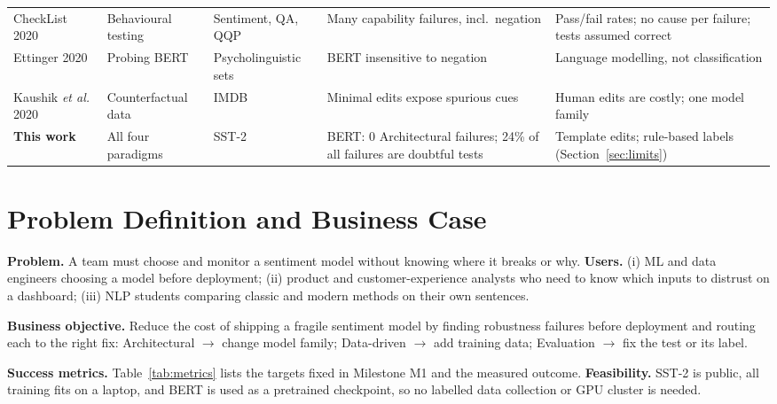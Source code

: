 \documentclass[conference]{IEEEtran}
\begin{document}
\begin{table}[t]
\begin{tabular}{@{}p{3.0cm}p{2.6cm}p{2.5cm}p{3.6cm}p{4.6cm}@{}}
CheckList 2020~\cite{ribeiro2020} & Behavioural testing & Sentiment, QA, QQP & Many capability failures, incl.\ negation & Pass/fail rates; no cause per failure; tests assumed correct \\
Ettinger 2020~\cite{ettinger2020} & Probing BERT & Psycholinguistic sets & BERT insensitive to negation & Language modelling, not classification \\
Kaushik \emph{et al.} 2020~\cite{kaushik2020} & Counterfactual data & IMDB & Minimal edits expose spurious cues & Human edits are costly; one model family \\
\midrule
\textbf{This work} & All four paradigms & SST-2 & BERT: 0 Architectural failures; 24\% of all failures are doubtful tests & Template edits; rule-based labels (Section~\ref{sec:limits}) \\
\bottomrule
\end{tabular}
\end{table}

\section{Problem Definition and Business Case}\label{sec:problem}

\textbf{Problem.} A team must choose and monitor a sentiment model without knowing where it breaks
or why. \textbf{Users.} (i) ML and data engineers choosing a model before deployment; (ii) product
and customer-experience analysts who need to know which inputs to distrust on a dashboard; (iii)
NLP students comparing classic and modern methods on their own sentences.

\textbf{Business objective.} Reduce the cost of shipping a fragile sentiment model by finding
robustness failures before deployment and routing each to the right fix: Architectural $\rightarrow$
change model family; Data-driven $\rightarrow$ add training data; Evaluation $\rightarrow$ fix the
test or its label.

\textbf{Success metrics.} Table~\ref{tab:metrics} lists the targets fixed in Milestone M1 and the
measured outcome. \textbf{Feasibility.} SST-2 is public, all training fits on a laptop, and BERT is
used as a pretrained checkpoint, so no labelled data collection or GPU cluster is needed.
\end{document}
